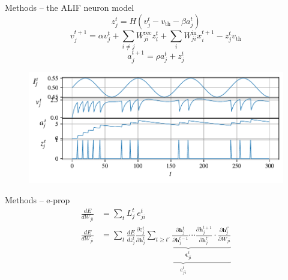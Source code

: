 \documentclass[t]{beamer}
\begin{document}
\begin{frame}{Methods -- the ALIF neuron model}
  \footnotesize
  \begin{equation}
  z^t_j = H\left(v_j^t - v_\text{th} - \beta a^t_j\right)
  \end{equation}
  \begin{equation}\label{eq:alifV}
  v^{t+1}_j = \alpha v_j^t + \sum_{i\neq j}W^\text{rec}_{ji}z_i^t + \sum_i W^\text{in}_{ji}x_i^{t+1} - z_j^tv_
  \text{th}
  \end{equation}
  \begin{equation}\label{eq:alifA}
  a^{t+1}_j = \rho a^t_j + z^t_j
  \end{equation}
  \begin{figure}[!ht]
    \centering
    \includegraphics[width=0.9\linewidth]{simplealif}
  \end{figure}
\end{frame}

\begin{frame}{Methods -- e-prop}
  \begin{align*}
    \frac{dE}{dW_{ji}} &= \sum_tL^t_j\ e^t_{ji}\\
    \frac{dE}{dW_{ji}} &= \sum_t\frac{dE}{dz_j^t}\underbrace{\frac{\partial z_j^t}{\partial\mathbf{h}_j^t}\underbrace{\sum_{t\geq t'}\frac{\partial\mathbf{h}^t_j}{\partial\mathbf{h}_j^{t-1}} \cdots \frac{\partial\mathbf{h}_j^{t+1}}{\partial\mathbf{h}_j^{t'}}\cdot\frac{\partial\mathbf{h}_j^{t'}}{\partial W_{ji}}}_{\mathbf{\epsilon}_{ji}^t}}_{e^t_{ji}}
    \end{align*}

\end{frame}
\end{document}
